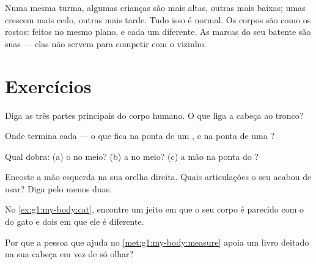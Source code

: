 \begin{remark}\label{rem:g1:my-body:different}
Numa mesma turma, algumas crianças são mais altas, outras mais
baixas; umas crescem mais cedo, outras mais tarde. Tudo isso é
normal. Os corpos são como os rostos: feitos no mesmo plano, e cada
um diferente. As marcas do seu batente são suas --- elas não servem
para competir com o vizinho.
\end{remark}

\section{Exercícios}

\begin{exercise}[$\star$]\label{exo:g1:my-body:1}
Diga as três partes principais do corpo humano. O que liga a cabeça
ao tronco?
\end{exercise}

\begin{exercise}[$\star$]\label{exo:g1:my-body:2}
Onde termina cada  --- o que fica na ponta de um , e na
ponta de uma ?
\end{exercise}

\begin{exercise}[$\star$]\label{exo:g1:my-body:3}
Qual  dobra: (a) o  no meio? (b) a  no meio?
(c) a mão na ponta do ?
\end{exercise}

\begin{exercise}[$\star$]\label{exo:g1:my-body:4}
Encoste a mão esquerda na sua orelha direita. Quais articulações o
seu  acabou de usar? Diga pelo menos duas.
\end{exercise}

\begin{exercise}[$\star$]\label{exo:g1:my-body:5}
No \cref{ex:g1:my-body:cat}, encontre um jeito em que o seu corpo é
parecido com o do gato e dois em que ele é diferente.
\end{exercise}

\begin{exercise}[$\star$]\label{exo:g1:my-body:6}
Por que a pessoa que ajuda no \cref{met:g1:my-body:measure} apoia um
livro deitado na sua cabeça em vez de só olhar?
\end{exercise}

